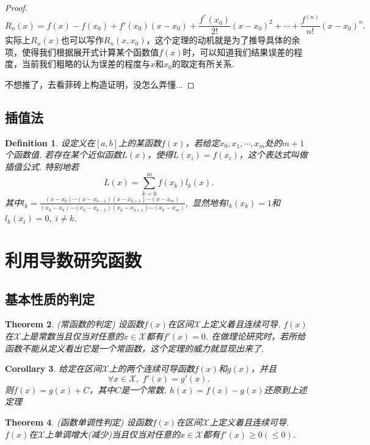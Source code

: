 \documentclass{article}
\newtheorem{theorem}{Theorem}[section]
\newtheorem{corollary}[theorem]{Corollary}
\newtheorem{definition}[theorem]{Definition}
\begin{document}
\begin{proof}
$$
R_n(x) = f(x) - f(x_0) + f'(x_0)(x-x_0) + \frac{f^{''}(x_0)}{2!}(x-x_0)^2 + \cdots + \frac{f^{(n)}}{n!}(x-x_0)^n.
$$
实际上$R_n(x)$也可以写作$R_n(x,x_0)$，这个定理的动机就是为了推导具体的余项，使得我们根据展开式计算某个函数值$f(x)$时，可以知道我们结果误差的程度，当前我们粗略的认为误差的程度与$x$和$x_0$的取定有所关系. 

不想推了，去看菲砖上构造证明，没怎么弄懂...
\end{proof}

\subsection{插值法}

\begin{definition}
\rm 设定义在$[a,b]$上的某函数$f(x)$，若给定$x_0,x_1,\cdots,x_m$处的$m+1$个函数值. 若存在某个近似函数$L(x)$，使得$L(x_i) = f(x_i)$，这个表达式叫做{\color{red}插值公式}. 特别地若
$$
L(x) = \sum\limits_{k=0}^m f(x_k)l_k(x).
$$
其中$l_k = \frac{(x-x_0)\cdots(x-x_{k-1})(x-x_{k+1})\cdots(x-x_m)}{(x_k-x_0)\cdots(x_k-x_{k-1})(x_k-x_{k+1})\cdots(x_k-x_m)},$ 显然地有$l_k(x_k) = 1$和$l_k(x_i) = 0,\;i \neq k$.
\end{definition}


\newpage
\section{利用导数研究函数}

\subsection{基本性质的判定}

\begin{theorem}
\rm {\color{red} (常函数的判定)} 设函数$f(x)$在区间$\mathcal{X}$上定义着且连续可导. $f(x)$在$\mathcal{X}$上是常数当且仅当对任意的$x \in \mathcal{X}$都有$f'(x)=0$. {\color{blue} 在做理论研究时，若所给函数不能从定义看出它是一个常函数，这个定理的威力就显现出来了.}
\end{theorem}

\begin{corollary}
\rm 给定在区间$\mathcal{X}$上的两个连续可导函数$f(x)$和$g(x)$，并且
$$
\forall x \in \mathcal{X},\;f'(x) = g'(x).
$$
则$f(x) = g(x) + C$，其中$C$是一个常数. {\color{red} $h(x) = f(x) - g(x)$还原到上述定理}
\end{corollary}


\begin{theorem}
\rm {\color{red} (函数单调性判定)} 设函数$f(x)$在区间$\mathcal{X}$上定义着且连续可导. $f(x)$在$\mathcal{X}$上单调增大(减少)当且仅当对任意的$x \in \mathcal{X}$都有$f'(x) \geq 0(\leq 0)$.
\end{theorem}
\end{document}
